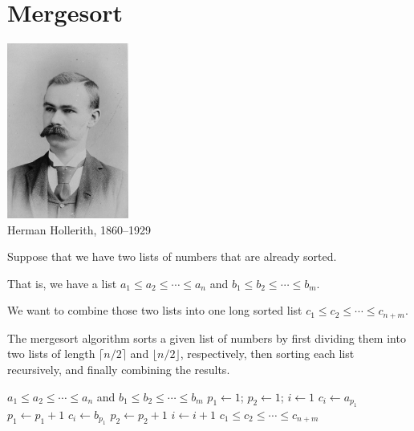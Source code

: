 
\newcommand{\mytitle}{Divide \&\ Conquer}
\newcommand{\mychpnr}{3}


\section{Mergesort}

\begin{frame}
\begin{center}
\includegraphics[width=4cm]{Figures/HollerithPhoto.jpg} \\
Herman Hollerith, 1860--1929
\end{center}
\end{frame}

\begin{frame}
Suppose that we have two lists of numbers that are already sorted.

That is, we have a list $a_1\le a_2\le\cdots\le a_n$ and $b_1\le
b_2\le\cdots\le b_m$.  

We want to combine those two lists into one
long sorted list $c_1\le c_2\le\cdots\le c_{n+m}$.

The mergesort algorithm sorts a given list of numbers by first
dividing them into two lists of length $\lceil n/2\rceil$ and $\lfloor
n/2\rfloor$, respectively, then sorting each list recursively, and
finally combining the results.
\end{frame}

\begin{frame}
\begin{algorithmic}[1]
\REQUIRE $a_1\le a_2\le\cdots\le a_n$ and $b_1\le b_2\le\cdots\le b_m$
\STATE $p_1\longleftarrow 1$; $p_2\longleftarrow 1$; $i\longleftarrow 1$
		\STATE $c_i\longleftarrow a_{p_1}$
		\STATE $p_1\longleftarrow p_1+1$
	\ELSE
		\STATE $c_i\longleftarrow b_{p_1}$
		\STATE $p_2\longleftarrow p_2+1$
	\ENDIF
	\STATE $i\longleftarrow i+1$
\ENDWHILE
\ENSURE $c_1\le c_2\le\cdots\le c_{n+m}$
\end{algorithmic}
\end{frame}

